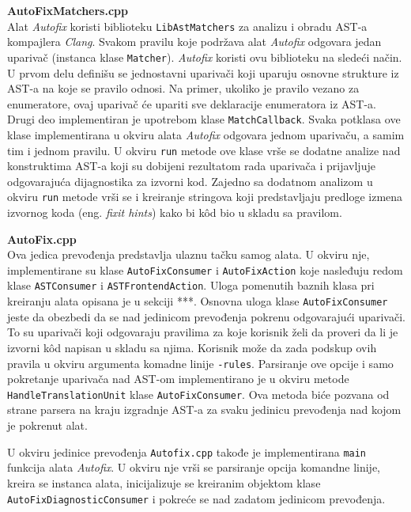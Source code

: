 \documentclass[12pt,oneside]{memoir}
\begin{document}
\begin{description}
\item{\textbf{AutoFixMatchers.cpp}} \\
Alat \textit{Autofix} koristi biblioteku \texttt{LibAstMatchers} za analizu i obradu AST-a kompajlera \textit{Clang}. Svakom pravilu koje podr\v{z}ava alat \textit{Autofix} odgovara jedan upariva\v{c} (instanca klase \texttt{Matcher}). \textit{Autofix} koristi ovu biblioteku na slede\'{c}i na\v{c}in. U prvom delu defini\v{s}u se jednostavni upariva\v{c}i koji uparuju osnovne strukture iz AST-a na koje se pravilo odnosi. Na primer, ukoliko je pravilo vezano za enumeratore, ovaj upariva\v{c} \'{c}e upariti sve deklaracije enumeratora iz AST-a. Drugi deo implementiran je upotrebom klase \texttt{MatchCallback}. Svaka potklasa ove klase implementirana u okviru alata \textit{Autofix} odgovara jednom upariva\v{c}u, a samim tim i jednom pravilu. U okviru \texttt{run} metode ove klase vr\v{s}e se
dodatne analize nad konstruktima AST-a koji su dobijeni rezultatom rada upariva\v{c}a i prijavljuje odgovaraju\'{c}a dijagnostika za izvorni kod. Zajedno sa dodatnom analizom u okviru \texttt{run} metode vr\v{s}i se i kreiranje stringova koji predstavljaju predloge izmena izvornog koda (eng. \textit{fixit hints}) kako bi k\^{o}d bio u skladu sa pravilom.
\item{\textbf{AutoFix.cpp}} \\
Ova jedica prevođenja predstavlja ulaznu ta\v{c}ku samog alata. U okviru nje, implementirane su klase \texttt{AutoFixConsumer} i \texttt{AutoFixAction} koje nasleđuju redom klase \texttt{ASTConsumer} i \texttt{ASTFrontendAction}. Uloga pomenutih baznih klasa pri kreiranju alata opisana je u sekciji ***. Osnovna uloga klase \texttt{AutoFixConsumer} jeste da obezbedi da se nad jedinicom prevođenja pokrenu odgovaraju\'{c}i upariva\v{c}i. To su upariva\v{c}i koji odgovaraju pravilima za koje korisnik \v{z}eli da proveri da li je izvorni k\^{o}d napisan u skladu sa njima. Korisnik mo\v{z}e da zada podskup ovih pravila u okviru argumenta komadne linije \texttt{-rules}. Parsiranje ove opcije i samo pokretanje upariva\v{c}a nad AST-om implementirano je u okviru metode \texttt{HandleTranslationUnit} klase \texttt{AutoFixConsumer}. Ova metoda bi\'{c}e pozvana od strane parsera na kraju izgradnje AST-a za svaku jedinicu prevođenja nad kojom je pokrenut alat.
\par 
U okviru jedinice prevođenja \texttt{Autofix.cpp} takođe je implementirana \texttt{main} funkcija alata \textit{Autofix}. U okviru nje vr\v{s}i se parsiranje opcija komandne linije, kreira se instanca alata, inicijalizuje se kreiranim objektom klase \texttt{AutoFixDiagnosticConsumer} i pokre\'{c}e se nad zadatom jedinicom prevođenja.
\end{description}
\end{document}
